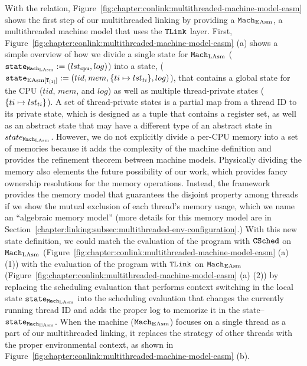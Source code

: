 With the relation, 
Figure~\ref{fig:chapter:conlink:multithreaded-machine-model-easm} shows
the first step of our multithreaded linking by providing 
a ${\mathrm{\texttt{Mach}}}_{\mathrm{EAsm}}$, a multithreaded machine model that uses the ${{\mathrm{\texttt{TLink}}}}$ layer.
First,  Figure~\ref{fig:chapter:conlink:multithreaded-machine-model-easm} (a)
shows a simple overview of how we divide a single state for ${\mathrm{\texttt{Mach}}}_{\mathrm{LAsm}}$  (${\mathrm{\texttt{state}}}_{{\mathrm{\texttt{Mach}}}_{\mathrm{LAsm}}} := (lst_{{\mathrm{\texttt{cpu}}}}, log)$)
into a state, (${\mathrm{\texttt{state}}}_{\mathrm{EAsm}[{{\mathrm{\texttt{T}}}_{[1]}}]} := (tid, mem, \{ti \mapsto lst_{ti}\}, log)$),
that contains a global state for the CPU ($tid$, $mem$, and $log$) as well as 
multiple thread-private states ($\{ti \mapsto lst_{ti}\}$).
A set of thread-private states is a partial map from a thread ID to its private state, which is designed as a tuple that contains
a register set, as well as an abstract state that may have a different type of an abstract state in $state_{{\mathrm{\texttt{Mach}}}_{\mathrm{LAsm}}}$. 
However, we do not explicitly divide a per-CPU memory into a  set of memories because 
it adds the complexity of the machine definition and provides the 
refinement theorem between machine models.
Physically dividing the memory also elements the future possibility of our work, which provides fancy ownership resolutions
for the memory operations.
Instead, the framework provides the memory model 
that guarantees the disjoint property among threads if we show the mutual exclusion of each thread's memory usage, which we name an ``algebraic memory model'' (more details for this memory model are in Section~\ref{chapter:linking:subsec:multithreaded-env-configuration}.)
With this new state definition, 
we could match the evaluation of the program with ${{\mathrm{\texttt{CSched}}}}$ on ${\mathrm{\texttt{Mach}}}_{\mathrm{LAsm}}$ (Figure~\ref{fig:chapter:conlink:multithreaded-machine-model-easm} (a) (1)) with  the evaluation of the program with ${{\mathrm{\texttt{TLink}}}}$ on ${\mathrm{\texttt{Mach}}}_{\mathrm{EAsm}}$
(Figure~\ref{fig:chapter:conlink:multithreaded-machine-model-easm} (a) (2)) 
by replacing the scheduling evaluation that performs context switching in the local state ${\mathrm{\texttt{state}}}_{{\mathrm{\texttt{Mach}}}_{\mathrm{LAsm}}}$
into  the scheduling evaluation that changes the currently running thread ID and 
adds the proper log to memorize it in the state--${\mathrm{\texttt{state}}}_{{\mathrm{\texttt{Mach}}}_{\mathrm{EAsm}}}$.
When the machine (${\mathrm{\texttt{Mach}}}_{\mathrm{EAsm}}$) focuses on a single thread as a part of our multithreaded linking, 
it replaces the strategy of other threads with the proper environmental context, as shown in Figure~\ref{fig:chapter:conlink:multithreaded-machine-model-easm} (b).

